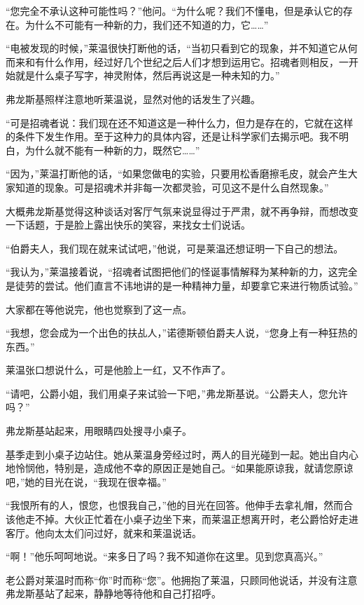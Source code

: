 \par “您完全不承认这种可能性吗？”他问。“为什么呢？我们不懂电，但是承认它的存在。为什么不可能有一种新的力，我们还不知道的力，它……”
\par “电被发现的时候，”莱温很快打断他的话，“当初只看到它的现象，并不知道它从何而来和有什么作用，经过好几个世纪之后人们才想到运用它。招魂者则相反，一开始就是什么桌子写字，神灵附体，然后再说这是一种未知的力。”
\par 弗龙斯基照样注意地听莱温说，显然对他的话发生了兴趣。
\par “可是招魂者说：我们现在还不知道这是一种什么力，但力是存在的，它就在这样的条件下发生作用。至于这种力的具体内容，还是让科学家们去揭示吧。我不明白，为什么就不能有一种新的力，既然它……”
\par “因为，”莱温打断他的话，“如果您做电的实验，只要用松香磨擦毛皮，就会产生大家知道的现象。可是招魂术并非每一次都灵验，可见这不是什么自然现象。”
\par 大概弗龙斯基觉得这种谈话对客厅气氛来说显得过于严肃，就不再争辩，而想改变一下话题，于是脸上露出快乐的笑容，来找女士们说话。
\par “伯爵夫人，我们现在就来试试吧，”他说，可是莱温还想证明一下自己的想法。
\par “我认为，”莱温接着说，“招魂者试图把他们的怪诞事情解释为某种新的力，这完全是徒劳的尝试。他们直言不讳地讲的是一种精神力量，却要拿它来进行物质试验。”
\par 大家都在等他说完，他也觉察到了这一点。
\par “我想，您会成为一个出色的扶乩人，”诺德斯顿伯爵夫人说，“您身上有一种狂热的东西。”
\par 莱温张口想说什么，可是他脸上一红，又不作声了。
\par “请吧，公爵小姐，我们用桌子来试验一下吧，”弗龙斯基说。“公爵夫人，您允许吗？”
\par 弗龙斯基站起来，用眼睛四处搜寻小桌子。
\par 基季走到小桌子边站住。她从莱温身旁经过时，两人的目光碰到一起。她出自内心地怜悯他，特别是，造成他不幸的原因正是她自己。“如果能原谅我，就请您原谅吧，”她的目光在说，“我现在很幸福。”
\par “我恨所有的人，恨您，也恨我自己，”他的目光在回答。他伸手去拿礼帽，然而合该他走不掉。大伙正忙着在小桌子边坐下来，而莱温正想离开时，老公爵恰好走进客厅。他向太太们问过好，就来和莱温说话。
\par “啊！”他乐呵呵地说。“来多日了吗？我不知道你在这里。见到您真高兴。”
\par 老公爵对莱温时而称“你”时而称“您”。他拥抱了莱温，只顾同他说话，并没有注意弗龙斯基站了起来，静静地等待他和自己打招呼。
